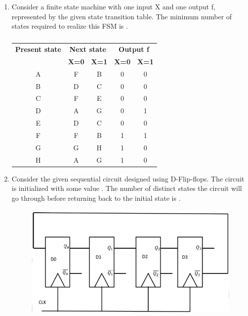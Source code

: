 \documentclass[a4paper, 11pt]{article}
\begin{document}
\begin{enumerate}
    \hfill{}

    \item Consider a finite state machine  with one input X and one output f, represented by the given state transition table. The minimum number of states required to realize this FSM is \underline{\hspace{2cm}}. 
    
    \begin{table}[H]
        \centering
        \begin{tabular}{|c|c|c|c|c|}
            \hline
            \textbf{Present state} & \multicolumn{2}{c|}{\textbf{Next state}} & \multicolumn{2}{c|}{\textbf{Output f}} \\
            \cline{2-5}
             & \textbf{X=0} & \textbf{X=1} & \textbf{X=0} & \textbf{X=1} \\
            \hline
            A & F & B & 0 & 0 \\
            \hline
            B & D & C & 0 & 0 \\
            \hline
            C & F & E & 0 & 0 \\
            \hline
            D & A & G & 0 & 1 \\
            \hline
            E & D & C & 0 & 0 \\
            \hline
            F & F & B & 1 & 1 \\
            \hline
            G & G & H & 1 & 0 \\
            \hline
            H & A & G & 1 & 0 \\
            \hline
        \end{tabular}
        \caption*{}
    \end{table}

    \hfill{}

    \item Consider the given sequential circuit designed using D-Flip-flops. The circuit is initialized with some value . The number of distinct states the circuit will go through before returning back to the initial state is \underline{\hspace{2cm}}. 
    \begin{figure}[H]
        \centering
        \includegraphics[width=0.7\columnwidth]{figs/q60.png}
    \end{figure}


\end{enumerate}
\end{document}

